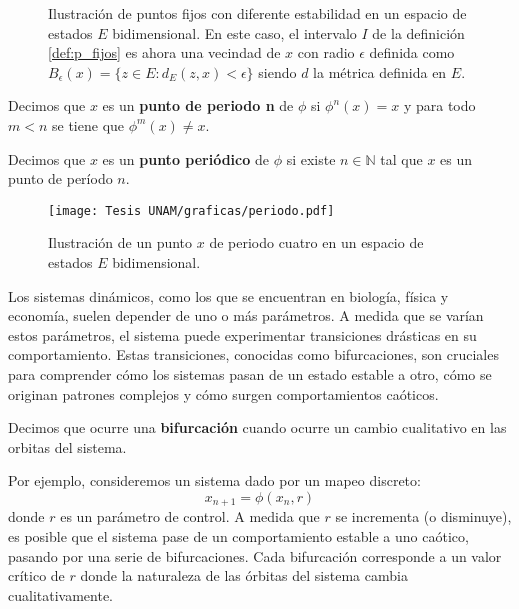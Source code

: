 \documentclass[../Main.tex]{subfiles}
\begin{document}
\begin{figure}[h!]
\hfill
{}
\hfill
{}
\hfill
\caption{Ilustración de puntos fijos con diferente estabilidad en un espacio de estados $E$ bidimensional. En este caso, el intervalo $I$ de la definición \ref{def:p_fijos} es ahora una vecindad de $x$ con radio $\epsilon$ definida como $B_{\epsilon}(x)=\{z\in E: d_E(z,x)<\epsilon\}$ siendo $d$ la métrica definida en $E$.}
\label{fig:p_fijos}
\end{figure}
\begin{definition}
    Decimos que $x$ es un \textbf{punto de periodo n} de $\phi$ si $\phi^n(x)=x$ y para todo $m<n$ se tiene que $\phi^m(x)\neq x$.
\end{definition}
\begin{definition}
    Decimos que $x$ es un \textbf{punto periódico} de $\phi$ si existe $n \in \mathbb{N}$ tal que $x$ es un punto de período $n$.
\end{definition}

\begin{figure}[h!]
    \centering
    \texttt{[image: Tesis UNAM/graficas/periodo.pdf]}
    \caption{Ilustración de un punto $x$ de periodo cuatro en un espacio de estados $E$ bidimensional.}
    \label{fig:periodo}
\end{figure} 

Los sistemas dinámicos, como los que se encuentran en biología, física y economía, suelen depender de uno o más parámetros. A medida que se varían estos parámetros, el sistema puede experimentar transiciones drásticas en su comportamiento. Estas transiciones, conocidas como bifurcaciones, son cruciales para comprender cómo los sistemas pasan de un estado estable a otro, cómo se originan patrones complejos y cómo surgen comportamientos caóticos.

\begin{definition}
    Decimos que ocurre una \textbf{bifurcación} cuando ocurre un cambio cualitativo en las orbitas del sistema. 
\end{definition}

Por ejemplo, consideremos un sistema dado por un mapeo discreto:
\[
x_{n+1} = \phi(x_n, r)
\]
donde \( r \) es un parámetro de control. A medida que \( r \) se incrementa (o disminuye), es posible que el sistema pase de un comportamiento estable a uno caótico, pasando por una serie de bifurcaciones.  Cada bifurcación corresponde a un valor crítico de \( r \) donde la naturaleza de las órbitas del sistema cambia cualitativamente.
\end{document}
